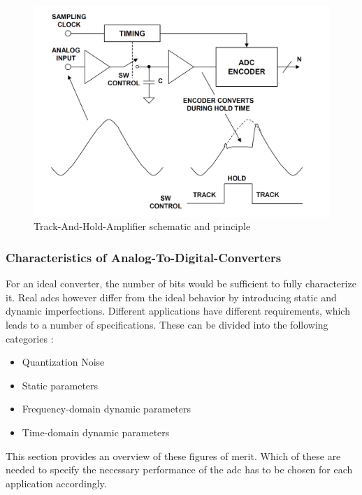 \begin{figure}[tbh]
	\centering
	\includegraphics[width = \textwidth]{chap/02-theory/img/tha}
	\caption{Track-And-Hold-Amplifier schematic and principle \cite{walt}}
	\label{fig:tha}
\end{figure}

\subsubsection*{Characteristics of Analog-To-Digital-Converters} 
For an ideal converter, the number of bits would be sufficient to fully characterize it.
Real \glspl{adc} however differ from the ideal behavior by introducing static and dynamic imperfections.
Different applications have different requirements, which leads to a number of specifications.
These can be divided into the following categories \cite{Lundberg}:
\begin{itemize}[noitemsep]
	\item Quantization Noise
	\item Static parameters
	\item Frequency-domain dynamic parameters
	\item Time-domain dynamic parameters
\end{itemize}
This section provides an overview of these figures of merit.
Which of these are needed to specify the necessary performance of the \gls{adc} has to be chosen for each application accordingly.

